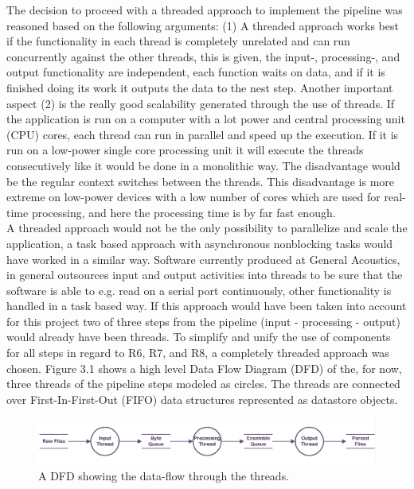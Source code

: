 The decision to proceed with a threaded approach to implement the pipeline was reasoned based on the following arguments: (1) A threaded approach works best if the functionality in each thread is completely unrelated and can run concurrently against the other threads, this is given, the input-, processing-, and output functionality are independent, each function waits on data, and if it is finished doing its work it outputs the data to the nest step. Another important aspect (2) is the really good scalability generated through the use of threads. If the application is run on a computer with a lot power and central processing unit (CPU) cores, each thread can run in parallel and speed up the execution. If it is run on a low-power single core processing unit it will execute the threads consecutively like it would be done in a monolithic way. The disadvantage would be the regular context switches between the threads. This disadvantage is more extreme on low-power devices with a low number of cores which are used for real-time processing, and here the processing time is by far fast enough.\\ 
A threaded approach would not be the only possibility to parallelize and scale the application, a task based approach with asynchronous nonblocking tasks would have worked in a similar way. Software currently produced at General Acoustics, in general outsources input and output activities into threads to be sure that the software is able to e.g. read on a serial port continuously, other functionality is handled in a task based way. If this approach would have been taken into account for this project two of three steps from the pipeline (input - processing - output) would already have been threads. To simplify and unify the use of components for all steps in regard to R6, R7, and R8, a completely threaded approach was chosen. Figure 3.1 shows a high level Data Flow Diagram (DFD) of the, for now, three threads of the pipeline steps modeled as circles. The threads are connected over First-In-First-Out (FIFO) data structures represented as datastore objects. 

\begin{figure}[h]
\centering
      \includegraphics[width=1\textwidth]{dfd}
        \caption{A DFD showing the data-flow through the threads.}
\end{figure}

